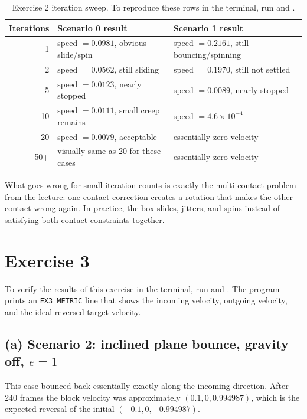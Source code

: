 \documentclass[11pt]{article}
\begin{document}
\begin{table}[H]
\centering
\caption{Exercise 2 iteration sweep. To reproduce these rows in the terminal, run \texttt{} and \texttt{}.}
\begin{tabular}{@{}rll@{}}
\toprule
Iterations & Scenario 0 result & Scenario 1 result \\
\midrule
1   & speed $=0.0981$, obvious slide/spin & speed $=0.2161$, still bouncing/spinning \\
2   & speed $=0.0562$, still sliding & speed $=0.1970$, still not settled \\
5   & speed $=0.0123$, nearly stopped & speed $=0.0089$, nearly stopped \\
10  & speed $=0.0111$, small creep remains & speed $=4.6\times 10^{-4}$ \\
20  & speed $=0.0079$, acceptable & essentially zero velocity \\
50+ & visually same as 20 for these cases & essentially zero velocity \\
\bottomrule
\end{tabular}
\end{table}

What goes wrong for small iteration counts is exactly the multi-contact problem from the lecture: one contact correction creates a rotation that makes the other contact wrong again. In practice, the box slides, jitters, and spins instead of satisfying both contact constraints together.

\section*{Exercise 3}

To verify the results of this exercise in the terminal, run
\texttt{}
and
\texttt{}.
The program prints an \texttt{EX3\_METRIC} line that shows the incoming velocity, outgoing velocity, and the ideal reversed target velocity.

\subsection*{(a) Scenario 2: inclined plane bounce, gravity off, $e=1$}
This case bounced back essentially exactly along the incoming direction. After 240 frames the block velocity was approximately $(0.1, 0, 0.994987)$, which is the expected reversal of the initial $(-0.1, 0, -0.994987)$.
\end{document}
